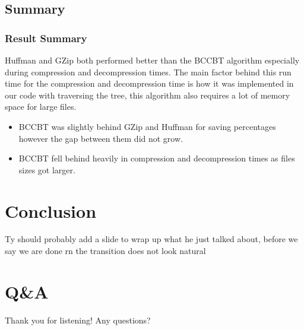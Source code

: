 \documentclass{beamer}
\begin{document}
\begin{frame}
\end{frame}
\subsection{Summary}
\begin{frame}
    \frametitle{Result Summary}
    Huffman and GZip both performed better than the BCCBT algorithm especially during 
    compression and decompression times.  The main factor behind this run time for the 
    compression and decompression time is how it was implemented in our code with traversing
    the tree, this algorithm also requires a lot of memory space for large files.
    \begin{itemize}
        \item{BCCBT was slightly behind GZip and Huffman for saving percentages however
        the gap between them did not grow.}
        \item{BCCBT fell behind heavily in compression and decompression times as files
        sizes got larger.}
    \end{itemize}
\end{frame}

\section{Conclusion}
\begin{frame}
 Ty should probably add a slide to wrap up what he just talked about, before we say we are done 
 rn the transition does not look natural
\end{frame}

\section{Q\&A}
\begin{frame}
Thank you for listening! Any questions?
\end{frame}
\end{document}
